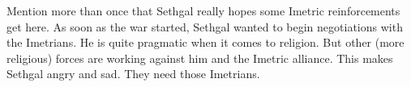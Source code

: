 \begin{changes}
  \begin{comment}
    \paragraph{Sethgal}
  \end{comment}
    Mention more than once that Sethgal really hopes some Imetric reinforcements get here.
    As soon as the war started, Sethgal wanted to begin negotiations with the Imetrians. 
    He is quite pragmatic when it comes to religion.
    But other (more religious) forces are working against him and the Imetric alliance.
    This makes Sethgal angry and sad.
    They need those Imetrians. 
\end{changes}





